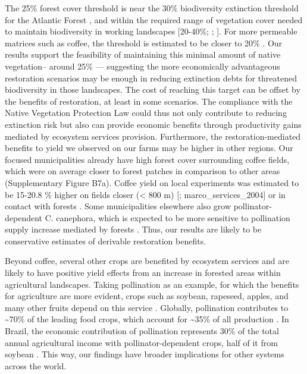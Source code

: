 \documentclass[
	12pt,				%
	oneside,			%
	a4paper,			%
	chapter=TITLE,		%
	section=TITLE,		%
	brazil,			%
	english				%
	]{abntex2}
\begin{document}
The 25\% forest cover threshold is near the 30\% biodiversity extinction threshold for the Atlantic Forest \autocite{banks-leite_using_2014}, and within the required range of vegetation cover needed to maintain biodiversity in working landscapes {[}20-40\%; \textcite{garibaldi_working_2020}; \textcite{arroyorodriguez_designing_2020}{]}. For more permeable matrices such as coffee, the threshold is estimated to be closer to 20\% \autocite{boesing_biodiversity_2018}. Our results support the feasibility of maintaining this minimal amount of native vegetation-- around 25\% \autocite{garibaldi_working_2020,arroyorodriguez_designing_2020} --- suggesting the more economically advantageous restoration scenarios may be enough in reducing extinction debts for threatened biodiversity in those landscapes. The cost of reaching this target can be offset by the benefits of restoration, at least in some scenarios. The compliance with the Native Vegetation Protection Law could thus not only contribute to reducing extinction risk but also can provide economic benefits through productivity gains mediated by ecosystem services provision. Furthermore, the restoration-mediated benefits to yield we observed on our farms may be higher in other regions. Our focused municipalities already have high forest cover surrounding coffee fields, which were on average closer to forest patches in comparison to other areas (Supplementary Figure B7a). Coffee yield on local experiments was estimated to be 15-20.8 \% higher on fields closer (\textless{} 800 m) {[}\textcite{ricketts_economic_2004}; marco\_services\_2004{]} or in contact with forests \autocite{latini_reconciling_2020}. Some municipalities elsewhere also grow pollinator-dependent C. canephora, which is expected to be more sensitive to pollination supply increase mediated by forests \href{Supplementary\%20Figure\%20B7b}{\textcite{gonzalez-chaves_positive_2021}}. Thus, our results are likely to be conservative estimates of derivable restoration benefits.

Beyond coffee, several other crops are benefited by ecosystem services and are likely to have positive yield effects from an increase in forested areas within agricultural landscapes. Taking pollination as an example, for which the benefits for agriculture are more evident, crops such as soybean, rapeseed, apples, and many other fruits depend on this service \autocite{klein_importance_2007}. Globally, pollination contributes to \textasciitilde70\% of the leading food crops, which account for \textasciitilde35\% of all production \autocite{klein_importance_2007}. In Brazil, the economic contribution of pollination represents 30\% of the total annual agricultural income with pollinator-dependent crops, half of it from soybean \autocite{giannini_dependence_2015}. This way, our findings have broader implications for other systems across the world.
\end{document}
